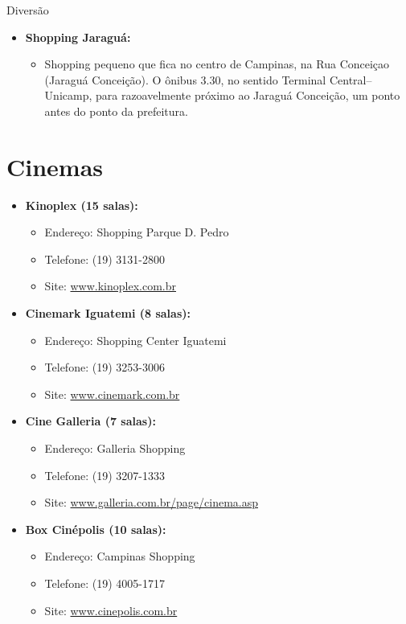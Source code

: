 \begin{story}{Diversão}
\begin{itemize}
\begin{itemize}
\item \textbf{Shopping Jaraguá:}
\begin{itemize}
\item Shopping pequeno que fica no centro de Campinas, na Rua Conceiçao (Jaraguá Conceição). O ônibus 3.30, no sentido Terminal Central–Unicamp, para razoavelmente próximo ao Jaraguá Conceição, um ponto antes do ponto da prefeitura.
\end{itemize}

\end{itemize}

\section*{Cinemas}

\begin{itemize}

\item \textbf{Kinoplex (15 salas):}
\begin{itemize}
\item Endereço: Shopping Parque D. Pedro
\item Telefone: (19) 3131-2800
\item Site: \url{www.kinoplex.com.br} 
\end{itemize}

\item \textbf{Cinemark Iguatemi (8 salas):}
\begin{itemize}
\item Endereço: Shopping Center Iguatemi
\item Telefone: (19) 3253-3006
\item Site: \url{www.cinemark.com.br}
\end{itemize}

\item \textbf{Cine Galleria (7 salas):}
\begin{itemize}
\item Endereço: Galleria Shopping
\item Telefone: (19) 3207-1333
\item Site: \url{www.galleria.com.br/page/cinema.asp} 
\end{itemize}

\item \textbf{Box Cinépolis (10 salas):}
\begin{itemize}
\item Endereço: Campinas Shopping
\item Telefone: (19) 4005-1717
\item Site: \url{www.cinepolis.com.br}
\end{itemize}


\end{itemize}
\end{itemize}
\end{story}
